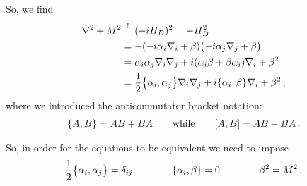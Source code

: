 \documentclass[main.tex]{subfiles}
\begin{document}
So, we find 
%
\begin{align}
\nabla^2 + M^2 &\overset{!}{=} (-i H_D)^2 = - H_D^2  \\
&= -\qty(-i \alpha_{i}  \nabla_{i} + \beta ) \qty(-i \alpha_{j} \nabla_{j} + \beta )  \\
&= \alpha_{i} \alpha_{j} \nabla_{i} \nabla_{j} + i \qty(\alpha_{i} \beta  + \beta \alpha_{i}) \nabla_{i} + \beta^2  \\
&= \frac{1}{2} \qty{\alpha_{i}, \alpha_{j}} \nabla_{i} \nabla_{j} 
+ i \qty{\alpha_{i}, \beta } \nabla_{i} + \beta^2
\,,
\end{align}
%
where we introduced the anticommutator bracket notation: 
%
\begin{align}
\qty{A, B} = AB + BA
\qquad \text{while} \qquad
\qty[A, B] = AB - BA
\,.
\end{align}

So, in order for the equations to be equivalent we need to impose 
%
\begin{align}
\frac{1}{2}\qty{\alpha_{i}, \alpha_{j}} = \delta_{ij}
\qquad \qquad 
\qty{\alpha_{i}, \beta } = 0
\qquad \qquad 
\beta^2 = M^2
\,.
\end{align}
%
\end{document}
